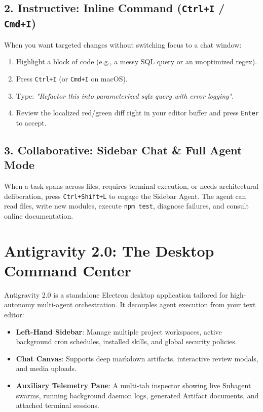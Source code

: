 \documentclass[11pt,a4paper,oneside]{book}
\begin{document}
\subsection{2. Instructive: Inline Command (\texttt{Ctrl+I} / \texttt{Cmd+I})}
When you want targeted changes without switching focus to a chat window:
\begin{enumerate}
    \item Highlight a block of code (e.g., a messy SQL query or an unoptimized regex).
    \item Press \texttt{Ctrl+I} (or \texttt{Cmd+I} on macOS).
    \item Type: \textit{"Refactor this into parameterized sqlx query with error logging"}.
    \item Review the localized red/green diff right in your editor buffer and press \texttt{Enter} to accept.
\end{enumerate}

\subsection{3. Collaborative: Sidebar Chat \& Full Agent Mode}
When a task spans across files, requires terminal execution, or needs architectural deliberation, press \texttt{Ctrl+Shift+L} to engage the Sidebar Agent. The agent can read files, write new modules, execute \texttt{npm test}, diagnose failures, and consult online documentation.

\section{Antigravity 2.0: The Desktop Command Center}
Antigravity 2.0 is a standalone Electron desktop application tailored for high-autonomy multi-agent orchestration. It decouples agent execution from your text editor:

\begin{itemize}
    \item \textbf{Left-Hand Sidebar}: Manage multiple project workspaces, active background cron schedules, installed skills, and global security policies.
    \item \textbf{Chat Canvas}: Supports deep markdown artifacts, interactive review modals, and media uploads.
    \item \textbf{Auxiliary Telemetry Pane}: A multi-tab inspector showing live Subagent swarms, running background daemon logs, generated Artifact documents, and attached terminal sessions.
\end{itemize}
\end{document}
